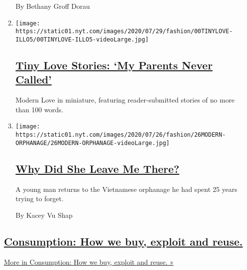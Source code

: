 \begin{enumerate}
  By Bethany Groff Dorau
\item
  \texttt{[image: https://static01.nyt.com/images/2020/07/29/fashion/00TINYLOVE-ILLO5/00TINYLOVE-ILLO5-videoLarge.jpg]}

  \hypertarget{tiny-love-stories-my-parents-never-called}{%
  \subsection{\texorpdfstring{\href{/2020/07/28/style/tiny-modern-love-stories-coronavirus-my-parents-never-called.html}{Tiny
  Love Stories: `My Parents Never
  Called'}}{Tiny Love Stories: `My Parents Never Called'}}\label{tiny-love-stories-my-parents-never-called}}

  Modern Love in miniature, featuring reader-submitted stories of no
  more than 100 words.
\item
  \texttt{[image: https://static01.nyt.com/images/2020/07/26/fashion/26MODERN-ORPHANAGE/26MODERN-ORPHANAGE-videoLarge.jpg]}

  \hypertarget{why-did-she-leave-me-there}{%
  \subsection{\texorpdfstring{\href{/2020/07/24/style/modern-love-adoption-vietnam-why-did-she-leave-me-there.html}{Why
  Did She Leave Me
  There?}}{Why Did She Leave Me There?}}\label{why-did-she-leave-me-there}}

  A young man returns to the Vietnamese orphanage he had spent 25 years
  trying to forget.

  By Kacey Vu Shap
\end{enumerate}

\hypertarget{consumption-how-we-buy-exploit-and-reuse}{%
\subsection{\texorpdfstring{\href{/issue/fashion/2019/12/16/consumption}{Consumption:
How we buy, exploit and
reuse.}}{Consumption: How we buy, exploit and reuse.}}\label{consumption-how-we-buy-exploit-and-reuse}}

\href{/issue/fashion/2019/12/16/consumption}{More in Consumption: How we
buy, exploit and reuse. »}

